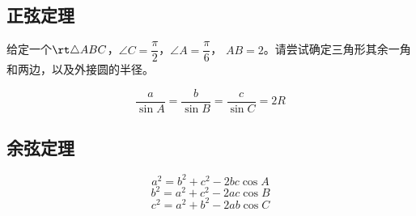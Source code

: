 \subsection{正弦定理}
\begin{example}
    给定一个$\rt \triangle ABC$，\(\angle C =\dfrac{\pi}{2}\)，\(\angle A=\dfrac{\pi}{6}\)，
    \(AB=2\)。请尝试确定三角形其余一角和两边，以及外接圆的半径。
\end{example}
\begin{jie}
    
\end{jie}
\begin{theorem}[正弦定理]
  \begin{equation}
      \frac{a}{\sin A}=\frac{b}{\sin B }=\frac{c}{\sin C}=2R
  \end{equation}
\end{theorem}
\clearpage
\subsection{余弦定理}
\begin{theorem}[余弦定理]
\begin{equation}
    a^2=b^2+c^2-2bc\cos A
\end{equation}
\begin{equation}
    b^2=a^2+c^2-2ac\cos B
\end{equation}
\begin{equation}
    c^2=a^2+b^2-2ab\cos C
\end{equation}
\end{theorem}
\clearpage
